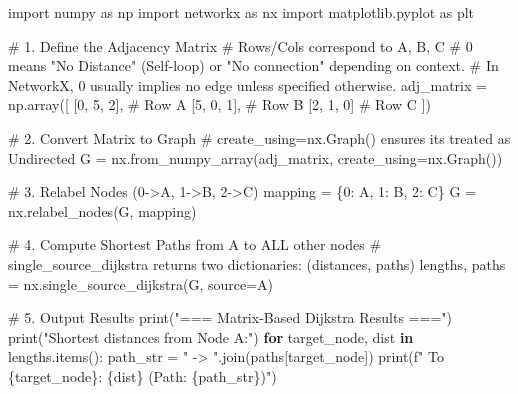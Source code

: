 \documentclass[
  letterpaper,
  DIV=11,
  numbers=noendperiod]{scrreprt}
\newenvironment{Shaded}{\begin{snugshade}}{\end{snugshade}}
\newcommand{\BuiltInTok}[1]{\textcolor[rgb]{0.00,0.23,0.31}{#1}}
\newcommand{\CommentTok}[1]{\textcolor[rgb]{0.37,0.37,0.37}{#1}}
\newcommand{\ControlFlowTok}[1]{\textcolor[rgb]{0.00,0.23,0.31}{\textbf{#1}}}
\newcommand{\DecValTok}[1]{\textcolor[rgb]{0.68,0.00,0.00}{#1}}
\newcommand{\ImportTok}[1]{\textcolor[rgb]{0.00,0.46,0.62}{#1}}
\newcommand{\KeywordTok}[1]{\textcolor[rgb]{0.00,0.23,0.31}{\textbf{#1}}}
\newcommand{\NormalTok}[1]{\textcolor[rgb]{0.00,0.23,0.31}{#1}}
\newcommand{\OperatorTok}[1]{\textcolor[rgb]{0.37,0.37,0.37}{#1}}
\newcommand{\SpecialCharTok}[1]{\textcolor[rgb]{0.37,0.37,0.37}{#1}}
\newcommand{\SpecialStringTok}[1]{\textcolor[rgb]{0.13,0.47,0.30}{#1}}
\newcommand{\StringTok}[1]{\textcolor[rgb]{0.13,0.47,0.30}{#1}}
\begin{document}
\begin{Shaded}
\begin{Highlighting}[]
\ImportTok{import}\NormalTok{ numpy }\ImportTok{as}\NormalTok{ np}
\ImportTok{import}\NormalTok{ networkx }\ImportTok{as}\NormalTok{ nx}
\ImportTok{import}\NormalTok{ matplotlib.pyplot }\ImportTok{as}\NormalTok{ plt}

\CommentTok{\# 1. Define the Adjacency Matrix}
\CommentTok{\# Rows/Cols correspond to A, B, C}
\CommentTok{\# 0 means "No Distance" (Self{-}loop) or "No connection" depending on context.}
\CommentTok{\# In NetworkX, 0 usually implies no edge unless specified otherwise.}
\NormalTok{adj\_matrix }\OperatorTok{=}\NormalTok{ np.array([}
\NormalTok{    [}\DecValTok{0}\NormalTok{, }\DecValTok{5}\NormalTok{, }\DecValTok{2}\NormalTok{],  }\CommentTok{\# Row A}
\NormalTok{    [}\DecValTok{5}\NormalTok{, }\DecValTok{0}\NormalTok{, }\DecValTok{1}\NormalTok{],  }\CommentTok{\# Row B}
\NormalTok{    [}\DecValTok{2}\NormalTok{, }\DecValTok{1}\NormalTok{, }\DecValTok{0}\NormalTok{]   }\CommentTok{\# Row C}
\NormalTok{])}

\CommentTok{\# 2. Convert Matrix to Graph}
\CommentTok{\# create\_using=nx.Graph() ensures it\textquotesingle{}s treated as Undirected}
\NormalTok{G }\OperatorTok{=}\NormalTok{ nx.from\_numpy\_array(adj\_matrix, create\_using}\OperatorTok{=}\NormalTok{nx.Graph())}

\CommentTok{\# 3. Relabel Nodes (0{-}\textgreater{}A, 1{-}\textgreater{}B, 2{-}\textgreater{}C)}
\NormalTok{mapping }\OperatorTok{=}\NormalTok{ \{}\DecValTok{0}\NormalTok{: }\StringTok{\textquotesingle{}A\textquotesingle{}}\NormalTok{, }\DecValTok{1}\NormalTok{: }\StringTok{\textquotesingle{}B\textquotesingle{}}\NormalTok{, }\DecValTok{2}\NormalTok{: }\StringTok{\textquotesingle{}C\textquotesingle{}}\NormalTok{\}}
\NormalTok{G }\OperatorTok{=}\NormalTok{ nx.relabel\_nodes(G, mapping)}

\CommentTok{\# 4. Compute Shortest Paths from A to ALL other nodes}
\CommentTok{\# single\_source\_dijkstra returns two dictionaries: (distances, paths)}
\NormalTok{lengths, paths }\OperatorTok{=}\NormalTok{ nx.single\_source\_dijkstra(G, source}\OperatorTok{=}\StringTok{\textquotesingle{}A\textquotesingle{}}\NormalTok{)}

\CommentTok{\# 5. Output Results}
\BuiltInTok{print}\NormalTok{(}\StringTok{"=== Matrix{-}Based Dijkstra Results ==="}\NormalTok{)}
\BuiltInTok{print}\NormalTok{(}\StringTok{"Shortest distances from Node A:"}\NormalTok{)}
\ControlFlowTok{for}\NormalTok{ target\_node, dist }\KeywordTok{in}\NormalTok{ lengths.items():}
\NormalTok{    path\_str }\OperatorTok{=} \StringTok{" {-}\textgreater{} "}\NormalTok{.join(paths[target\_node])}
    \BuiltInTok{print}\NormalTok{(}\SpecialStringTok{f"  To }\SpecialCharTok{\{}\NormalTok{target\_node}\SpecialCharTok{\}}\SpecialStringTok{: }\SpecialCharTok{\{}\NormalTok{dist}\SpecialCharTok{\}}\SpecialStringTok{ (Path: }\SpecialCharTok{\{}\NormalTok{path\_str}\SpecialCharTok{\}}\SpecialStringTok{)"}\NormalTok{)}


\end{Highlighting}
\end{Shaded}
\end{document}
